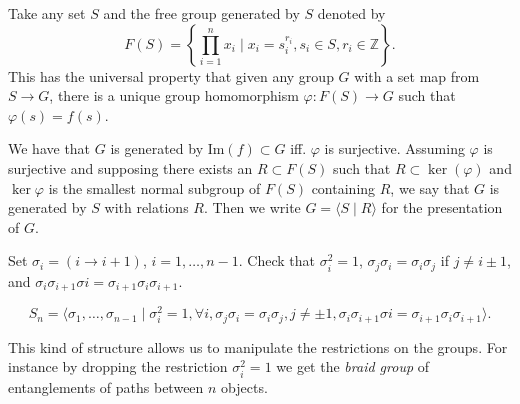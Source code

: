 \begin{defn}
Take any set $S$ and the
free group generated by $S$ denoted by
$$
F(S) = \left\{ \prod_{i = 1}^n x_i
         \mid x_i = s_i^{r_i}, s_i \in S,  r_i \in \mathbb{Z}
       \right\}.
$$
This has the universal property that given any group $G$ with a set
map from $S \to G$, there is a unique group homomorphism
$\varphi : F(S) \to G$ such that $\varphi(s) = f(s)$.

We have that $G$ is generated by $\mathrm{Im}(f) \subset G$
iff. $\varphi$ is surjective. Assuming $\varphi$ is surjective and
supposing there exists an $R \subset F(S)$ such that $R \subset
\ker(\varphi)$ and $\ker \varphi$ is the smallest normal subgroup of
$F(S)$ containing $R$, we say that $G$ is generated by $S$ with
relations $R$. Then we write $G = \langle S \mid R \rangle$ for the
presentation of $G$.
\end{defn}

\begin{xmpl}[Presentation of $S_n$]
Set $\sigma_i = (i \to i + 1)$, $i = 1, \dots, n - 1$. Check that
$\sigma_i^2 = 1$, $\sigma_j \sigma_i = \sigma_i \sigma_j$ if
$j \neq i \pm 1$, and
$\sigma_i \sigma_{i+1} \sigma{i} = \sigma_{i+1} \sigma_i
\sigma_{i+1}$.

\begin{theorem}
$$S_n = \langle \sigma_1, \dots, \sigma_{n-1}
         \mid \sigma_i^2 = 1, \forall i,
              \sigma_j \sigma_i = \sigma_i \sigma_j, j \neq \pm 1,
              \sigma_i \sigma_{i+1} \sigma{i} = \sigma_{i+1} \sigma_i
              \sigma_{i+1}
       \rangle.
$$
\end{theorem}
This kind of structure allows us to manipulate the restrictions on the
groups. For instance by dropping the restriction $\sigma_i^2 = 1$ we
get the \emph{braid group} of entanglements of paths between $n$ objects.
\end{xmpl}
